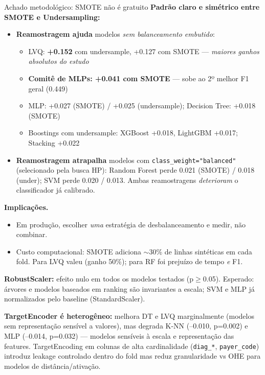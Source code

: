 \documentclass[aspectratio=169]{beamer}
\begin{document}
\begin{frame}[shrink=10]{Achado metodológico: SMOTE não é gratuito}
\textbf{Padrão claro e simétrico entre SMOTE e Undersampling:}

\vspace{0.6em}
\begin{itemize}
  \item \textbf{Reamostragem ajuda} modelos \emph{sem balanceamento embutido}:
  \begin{itemize}
    \item LVQ: \textbf{+0.152} com undersample, +0.127 com SMOTE — \emph{maiores ganhos absolutos do estudo}
    \item \textbf{Comitê de MLPs: +0.041 com SMOTE} — sobe ao 2º melhor F1 geral (0.449)
    \item MLP: +0.027 (SMOTE) / +0.025 (undersample); Decision Tree: +0.018 (SMOTE)
    \item Boostings com undersample: XGBoost +0.018, LightGBM +0.017; Stacking +0.022
  \end{itemize}
  \item \textbf{Reamostragem atrapalha} modelos com \texttt{class\_weight="balanced"} (selecionado pela busca HP): Random Forest perde 0.021 (SMOTE) / 0.018 (under); SVM perde 0.020 / 0.013. Ambas reamostragens \emph{deterioram} o classificador já calibrado.
\end{itemize}

\vspace{0.6em}
\textbf{Implicações.}
\begin{itemize}
  \item Em produção, escolher \emph{uma} estratégia de desbalanceamento e medir, não combinar.
  \item Custo computacional: SMOTE adiciona $\sim$30\% de linhas sintéticas em cada fold. Para LVQ valeu (ganho 50\%); para RF foi prejuízo de tempo \emph{e} F1.
\end{itemize}

\vspace{0.6em}
\textbf{RobustScaler:} efeito nulo em todos os modelos testados (p$\geq$0.05). Esperado: árvores e modelos baseados em ranking são invariantes a escala; SVM e MLP já normalizados pelo baseline (StandardScaler).

\vspace{0.4em}
\textbf{TargetEncoder é heterogêneo:} melhora DT e LVQ marginalmente (modelos sem representação sensível a valores), mas \alert{degrada K-NN (--0.010, p=0.002) e MLP (--0.014, p=0.032)} — modelos sensíveis à escala e representação das features. TargetEncoding em colunas de alta cardinalidade (\texttt{diag\_*}, \texttt{payer\_code}) introduz leakage controlado dentro do fold mas reduz granularidade vs OHE para modelos de distância/ativação.
\end{frame}
\end{document}
